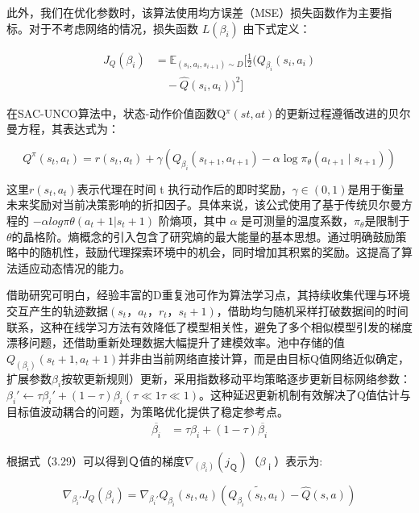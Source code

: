 此外，我们在优化参数时，该算法使用均方误差（MSE）损失函数作为主要指标。对于不考虑网络的情况，损失函数 \(L(β_i)\) 由下式定义：

\begin{equation}
	\begin{split}
		J_{Q}(\beta_{i}) 
		&= \mathbb{E}_{(s_i, a_i, s_{i+1}) \sim D} \bigg[ \frac{1}{2} \Big( Q_{\beta_i}(s_i, a_i) \\
		&\quad - \hat{Q}(s_i, a_i) \Big)^2 \bigg]
	\end{split}
\end{equation}

在SAC-UNCO算法中，状态-动作价值函数Q\(^π(st,at)\)的更新过程遵循改进的贝尔曼方程，其表达式为：

\begin{equation}
	Q^{\pi}(s_t, a_t) = r(s_t, a_t) + \gamma \left( Q_{\beta_i}(s_{t+1}, a_{t+1}) - \alpha \log \pi_{\theta}(a_{t+1} \mid s_{t+1}) \right)
\end{equation}

这里\(r(s_t,a_t)\)表示代理在时间 t 执行动作后的即时奖励，\(γ∈(0,1)\)是用于衡量未来奖励对当前决策影响的折扣因子。具体来说，该公式使用了基于传统贝尔曼方程的 \(−αlog⁡πθ(a_t+1|s_t+1)\) 阶熵项，其中 \(α\) 是可测量的温度系数，\(π_θ\)是限制于 \(θ\)的晶格阶。熵概念的引入包含了研究熵的最大能量的基本思想。通过明确鼓励策略中的随机性，鼓励代理探索环境中的机会，同时增加其积累的奖励。这提高了算法适应动态情况的能力。

借助研究可明白，经验丰富的D重复池可作为算法学习点，其持续收集代理与环境交互产生的轨迹数据\((s_t，a_t，r_t，s_t+1)\)，借助均匀随机采样打破数据间的时间联系，这种在线学习方法有效降低了模型相关性，避免了多个相似模型引发的梯度漂移问题，还借助重新处理数据大幅提升了建模效率。池中存储的值\(Q_(β_i)(s_t+1,a_t+1)\)并非由当前网络直接计算，而是由目标Q值网络近似确定，扩展参数\(β_i\)按软更新规则）更新，采用指数移动平均策略逐步更新目标网络参数：\(β_i′​←τβ_i′​+(1−τ)β_i(τ≪1τ≪1)\)。这种延迟更新机制有效解决了Q值估计与目标值波动耦合的问题，为策略优化提供了稳定参考点。
\begin{align}
	\overline{\beta_i} &= \tau \beta_i + (1 - \tau) \overline{\beta_i}
\end{align}

根据式（3.29）可以得到Ｑ值的梯度\(∇_(β_i) (j_Ｑ)（ β_ｉ）\)表示为:

\begin{equation}
	\nabla_{\beta_i'} J_Q(\beta_i) = \nabla_{\beta_i'} Q_{\beta_i}(s_t, a_t) \left( \widetilde{Q_{\beta_i}(s_t, a_t)} - \hat{Q}(s, a) \right)
\end{equation}

